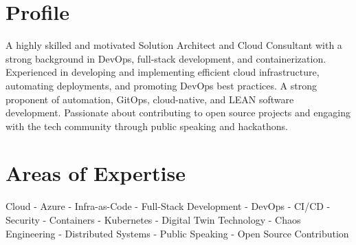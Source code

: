 


\section{Profile}
{A highly skilled and motivated Solution Architect and Cloud Consultant with a strong background in DevOps, full-stack development, and containerization. Experienced in developing and implementing efficient cloud infrastructure, automating deployments, and promoting DevOps best practices. A strong proponent of automation, GitOps, cloud-native, and LEAN software development. Passionate about contributing to open source projects and engaging with the tech community through public speaking and hackathons.}

\section{Areas of Expertise}
{Cloud - Azure - Infra-as-Code - Full-Stack Development - DevOps - CI/CD - Security - Containers - Kubernetes -  Digital Twin Technology - Chaos Engineering - Distributed Systems - Public Speaking - Open Source Contribution}

